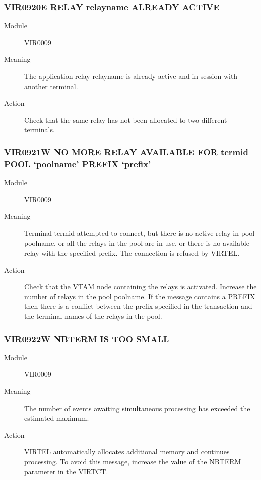 \documentclass[letterpaper,10pt,english]{sphinxmanual}
\begin{document}
\subsubsection{VIR0920E RELAY relayname ALREADY ACTIVE}
\label{\detokenize{messages:vir0920e-relay-relayname-already-active}}\begin{description}
\item[{Module}] \leavevmode
VIR0009

\item[{Meaning}] \leavevmode
The application relay relayname is already active and in session with another terminal.

\item[{Action}] \leavevmode
Check that the same relay has not been allocated to two different terminals.

\end{description}


\subsubsection{VIR0921W NO MORE RELAY AVAILABLE FOR termid POOL ‘poolname’ PREFIX ‘prefix’}
\label{\detokenize{messages:vir0921w-no-more-relay-available-for-termid-pool-poolname-prefix-prefix}}\begin{description}
\item[{Module}] \leavevmode
VIR0009

\item[{Meaning}] \leavevmode
Terminal termid attempted to connect, but there is no active relay in pool poolname, or all the relays in the pool are in use, or there is no available relay with the specified prefix. The connection is refused by VIRTEL.

\item[{Action}] \leavevmode
Check that the VTAM node containing the relays is activated. Increase the number of relays in the pool poolname.  If the message contains a PREFIX then there is a conflict between the prefix specified in the transaction and the terminal names of the relays in the pool.

\end{description}


\subsubsection{VIR0922W NBTERM IS TOO SMALL}
\label{\detokenize{messages:vir0922w-nbterm-is-too-small}}\begin{description}
\item[{Module}] \leavevmode
VIR0009

\item[{Meaning}] \leavevmode
The number of events awaiting simultaneous processing has exceeded the estimated maximum.

\item[{Action}] \leavevmode
VIRTEL automatically allocates additional memory and continues processing. To avoid this message, increase the value of the NBTERM parameter in the VIRTCT.

\end{description}
\end{document}
